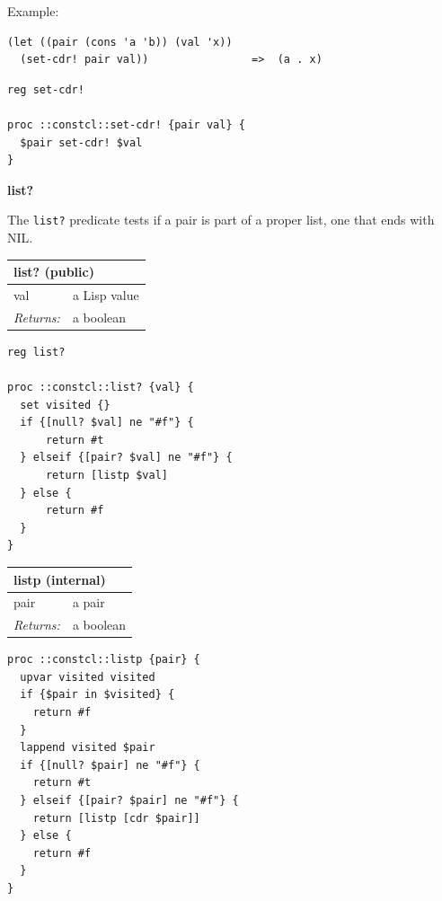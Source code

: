 \documentclass[twoside,9pt]{report}
\begin{document}
Example:

\noindent\makebox[\linewidth]{\rule{\linewidth}{0.4pt}}
\begin{lstlisting}
(let ((pair (cons 'a 'b)) (val 'x))
  (set-cdr! pair val))                =>  (a . x)
\end{lstlisting}
\noindent\makebox[\linewidth]{\rule{\linewidth}{0.4pt}}
\noindent\makebox[\linewidth]{\rule{\linewidth}{0.4pt}}
\begin{lstlisting}
reg set-cdr!
 
proc ::constcl::set-cdr! {pair val} {
  $pair set-cdr! $val
}
\end{lstlisting}
\noindent\makebox[\linewidth]{\rule{\linewidth}{0.4pt}}

\textbf{list?}


The \texttt{list?} predicate tests if a pair is part of a proper list, one that ends with NIL.

\begin{tabular}{ |l l| }
\hline
\multicolumn{2}{|l|}{list? (public)} \\
\hline
val & a Lisp value \\
\textit{Returns:} & a boolean \\
\hline
\end{tabular}

\noindent\makebox[\linewidth]{\rule{\linewidth}{0.4pt}}
\begin{lstlisting}
reg list?
 
proc ::constcl::list? {val} {
  set visited {}
  if {[null? $val] ne "#f"} {
      return #t
  } elseif {[pair? $val] ne "#f"} {
      return [listp $val]
  } else {
      return #f
  }
}
\end{lstlisting}
\noindent\makebox[\linewidth]{\rule{\linewidth}{0.4pt}}
\begin{tabular}{ |l l| }
\hline
\multicolumn{2}{|l|}{listp (internal)} \\
\hline
pair & a pair \\
\textit{Returns:} & a boolean \\
\hline
\end{tabular}

\noindent\makebox[\linewidth]{\rule{\linewidth}{0.4pt}}
\begin{lstlisting}
proc ::constcl::listp {pair} {
  upvar visited visited
  if {$pair in $visited} {
    return #f
  }
  lappend visited $pair
  if {[null? $pair] ne "#f"} {
    return #t
  } elseif {[pair? $pair] ne "#f"} {
    return [listp [cdr $pair]]
  } else {
    return #f
  }
}
\end{lstlisting}
\noindent\makebox[\linewidth]{\rule{\linewidth}{0.4pt}}
\end{document}
